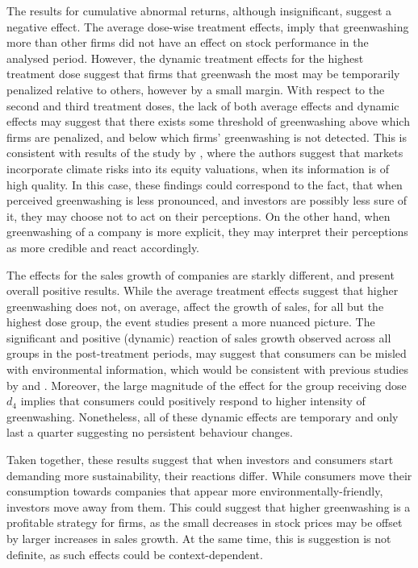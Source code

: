 \documentclass[12pt]{article}
\begin{document}
The results for cumulative abnormal returns, although insignificant, suggest a negative effect. The average dose-wise treatment effects, imply that greenwashing more than other firms did not have an effect on stock performance in the analysed period. However, the dynamic treatment effects for the highest treatment dose suggest that firms that greenwash the most may be temporarily penalized relative to others, however by a small margin. With respect to the second and third treatment doses, the lack of both average effects and dynamic effects may suggest that there exists some threshold of greenwashing above which firms are penalized, and below which firms' greenwashing is not detected. This is consistent with results of the study by \textcite{ilhanClimateRiskDisclosure2023}, where the authors suggest that markets incorporate climate risks into its equity valuations, when its information is of high quality. In this case, these findings could correspond to the fact, that when perceived greenwashing is less pronounced, and investors are possibly less sure of it, they may choose not to act on their perceptions. On the other hand, when greenwashing of a company is more explicit, they may interpret their perceptions as more credible and react accordingly.


The effects for the sales growth of companies are starkly different, and present overall positive results. While the average treatment effects suggest that higher greenwashing does not, on average, affect the growth of sales, for all but the highest dose group, the event studies present a more nuanced picture. The significant and positive (dynamic) reaction of sales growth observed across all groups in the post-treatment periods, may suggest that consumers can be misled with environmental information, which would be consistent with previous studies by \citeauthor{schmuckMisleadingConsumersGreen2018} and \citeauthor{parguelCanEvokingNature2015}. Moreover, the large magnitude of the effect for the group receiving dose $d_4$ implies that consumers could positively respond to higher intensity of greenwashing. Nonetheless, all of these dynamic effects are temporary and only last a quarter suggesting no persistent behaviour changes.

Taken together, these results suggest that when investors and consumers start demanding more sustainability, their reactions differ. While consumers move their consumption towards companies that appear more environmentally-friendly, investors move away from them. This could suggest that higher greenwashing is a profitable strategy for firms, as the small decreases in stock prices may be offset by larger increases in sales growth. At the same time, this is suggestion is not definite, as such effects could be context-dependent.  
\end{document}
